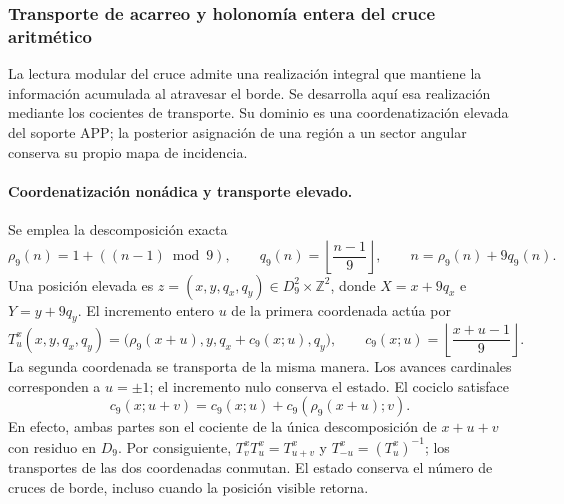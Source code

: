 \subsubsection{Transporte de acarreo y holonomía entera del cruce aritmético}
\label{subsec:transporte-entero-cruce}

La lectura modular del cruce admite una realización integral que mantiene
la información acumulada al atravesar el borde. Se desarrolla aquí esa
realización mediante los cocientes de transporte. Su dominio es una coordenatización
elevada del soporte APP; la posterior asignación de una región a un sector
angular conserva su propio mapa de incidencia.

\paragraph{Coordenatización nonádica y transporte elevado.}
Se emplea la descomposición exacta
\[
 \rho_9(n)=1+((n-1)\bmod9),\qquad
 q_9(n)=\left\lfloor\frac{n-1}{9}\right\rfloor,
 \qquad n=\rho_9(n)+9q_9(n).
\]
Una posición elevada es
$z=(x,y,q_x,q_y)\in D_9^2\times\mathbb Z^2$, donde
$X=x+9q_x$ e $Y=y+9q_y$. El incremento entero $u$ de la primera
coordenada actúa por
\[
 T^x_u(x,y,q_x,q_y)=
 \bigl(\rho_9(x+u),y,q_x+c_9(x;u),q_y\bigr),\qquad
 c_9(x;u)=\left\lfloor\frac{x+u-1}{9}\right\rfloor.
\]
La segunda coordenada se transporta de la misma manera. Los avances
cardinales corresponden a $u=\pm1$; el incremento nulo conserva el estado.
El cociclo satisface
\[
 c_9(x;u+v)=c_9(x;u)+c_9(\rho_9(x+u);v).
\]
En efecto, ambas partes son el cociente de la única descomposición de
$x+u+v$ con residuo en $D_9$. Por consiguiente,
$T^x_vT^x_u=T^x_{u+v}$ y $T^x_{-u}=(T^x_u)^{-1}$; los transportes
de las dos coordenadas conmutan. El estado conserva el número de cruces
de borde, incluso cuando la posición visible retorna.

